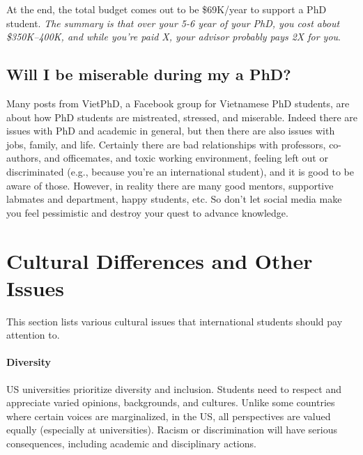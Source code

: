 \documentclass[11pt]{article}
\newcommand{\mycomment}[3][\color{blue}]{{#1{{#2}: {#3}}}}
\newcommand{\tvn}[1]{\mycomment{TVN}{#1}}{}
\begin{document}
At the end, the total budget comes out to be \$69K/year to support a PhD student. \emph{The summary is that over your 5-6 year of your PhD, you cost about \$350K--400K, and while you're paid X, your advisor probably pays 2X for you}.  





\subsection{Will I be miserable during my a PhD?}\label{sec:miserable}
Many posts from VietPhD, a Facebook group for Vietnamese PhD students, are about how PhD students are mistreated, stressed, and miserable.  Indeed there are issues with PhD and academic in general, but then there are also issues with jobs, family, and life.  Certainly there are bad relationships with professors, co-authors, and officemates, and toxic working environment, feeling left out or discriminated (e.g., because you're an international student), and it is good to be aware of those.  However, in reality there are many good mentors, supportive labmates and department, happy students, etc.  So don't let social media make you feel pessimistic and destroy your quest to advance knowledge.  


\section{Cultural Differences and Other Issues}\label{sec:cultural}

This section lists various cultural issues that international students should pay attention to.

\paragraph{Diversity} US universities prioritize diversity and inclusion. Students need to respect and appreciate varied opinions, backgrounds, and cultures. Unlike some countries where certain voices are marginalized, in the US, all perspectives are valued equally (especially at universities). Racism or discrimination will have serious consequences, including academic and disciplinary actions.
\end{document}
